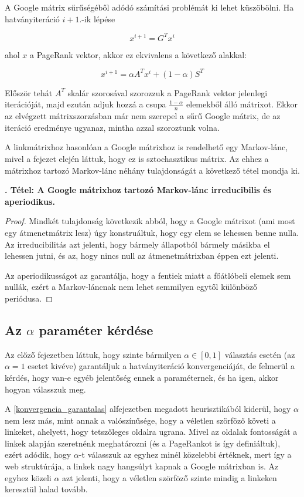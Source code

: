 \documentclass[12pt,a4paper]{article}
\newcounter{tszam}
\newenvironment{tetel}[1]
{{\medskip}\noindent \stepcounter{tszam}
{\bfseries{\thetszam. Tétel: #1\\[1ex]}}}{\bigskip }
\begin{document}
A Google mátrix sűrűségéből adódó számítási problémát ki lehet küszöbölni. Ha hatványiteráció $i+1$.-ik lépése

\[ x^{i+1} = G^T x^i \]

ahol $x$ a PageRank vektor, akkor ez ekvivalens a következő alakkal:

\[ x^{i+1} = \alpha A^T x^i + (1-\alpha) S^T \] 

Először tehát $A^T$ skalár szorosával szorozzuk a PageRank vektor jelenlegi iterációját, majd ezután adjuk hozzá a csupa $\frac{1-\alpha}{n}$ elemekből álló mátrixot. Ekkor az elvégzett mátrixszorzásban már nem szerepel a sűrű Google mátrix, de az iteráció eredménye ugyanaz, mintha azzal szoroztunk volna. 

\vspace{0.2cm}
A linkmátrixhoz hasonlóan a Google mátrixhoz is rendelhető egy Markov-lánc, mivel a fejezet elején láttuk, hogy ez is sztochasztikus mátrix. Az ehhez a mátrixhoz tartozó Markov-lánc néhány tulajdonságát a következő tétel mondja ki.

\begin{tetel}
	{A Google mátrixhoz tartozó Markov-lánc irreducibilis és aperiodikus.}
\end{tetel}
\vspace{-1cm}
\begin{proof}
	Mindkét tulajdonság következik abból, hogy a Google mátrixot (ami most egy átmenetmátrix lesz) úgy konstruáltuk, hogy egy elem se lehessen benne nulla. Az irreducibilitás azt jelenti, hogy bármely állapotból bármely másikba el lehessen jutni, és az, hogy nincs null az átmenetmátrixban éppen ezt jelenti. 
	
	Az aperiodikusságot az garantálja, hogy a fentiek miatt a főátlóbeli elemek sem nullák, ezért a Markov-láncnak nem lehet semmilyen egytől különböző periódusa.
\end{proof}


\subsection{Az $\alpha$ paraméter kérdése}

Az előző fejezetben láttuk, hogy szinte bármilyen $\alpha \in [0,1]$ választás esetén (az $\alpha=1$ esetet kivéve) garantáljuk a hatványiteráció konvergenciáját, de felmerül a kérdés, hogy van-e egyéb jelentőség ennek a paraméternek, és ha igen, akkor hogyan válasszuk meg.

A \ref{konvergencia_garantalas} alfejezetben megadott heurisztikából kiderül, hogy $\alpha$ nem lesz más, mint annak a valószínűsége, hogy a véletlen szörföző követi a linkeket, ahelyett, hogy tetszőleges oldalra ugrana. Mivel az oldalak fontosságát a linkek alapján szeretnénk meghatározni (és a PageRankot is így definiáltuk), ezért adódik, hogy $\alpha$-t válasszuk az egyhez minél közelebbi értéknek, mert így a web struktúrája, a linkek nagy hangsúlyt kapnak a Google mátrixban is. Az egyhez közeli $\alpha$ azt jelenti, hogy a véletlen szörföző szinte mindig a linkeken keresztül halad tovább.
\end{document}
